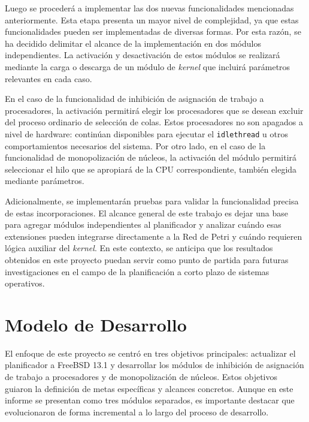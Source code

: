 Luego se procederá a implementar las dos nuevas funcionalidades mencionadas anteriormente. Esta etapa presenta un mayor nivel de complejidad, ya que estas funcionalidades pueden ser implementadas de diversas formas. Por esta razón, se ha decidido delimitar el alcance de la implementación en dos módulos independientes. La activación y desactivación de estos módulos se realizará mediante la carga o descarga de un módulo de \textit{kernel} que incluirá parámetros relevantes en cada caso.\par

En el caso de la funcionalidad de inhibición de asignación de trabajo a procesadores, la activación permitirá elegir los procesadores que se desean excluir del proceso ordinario de selección de colas. Estos procesadores no son apagados a nivel de hardware: continúan disponibles para ejecutar el \texttt{idlethread} u otros comportamientos necesarios del sistema. Por otro lado, en el caso de la funcionalidad de monopolización de núcleos, la activación del módulo permitirá seleccionar el hilo que se apropiará de la CPU correspondiente, también elegida mediante parámetros.\par

Adicionalmente, se implementarán pruebas para validar la funcionalidad precisa de estas incorporaciones. El alcance general de este trabajo es dejar una base para agregar módulos independientes al planificador y analizar cuándo esas extensiones pueden integrarse directamente a la Red de Petri y cuándo requieren lógica auxiliar del \textit{kernel}. En este contexto, se anticipa que los resultados obtenidos en este proyecto puedan servir como punto de partida para futuras investigaciones en el campo de la planificación a corto plazo de sistemas operativos.\par

\section{Modelo de Desarrollo}

El enfoque de este proyecto se centró en tres objetivos principales: actualizar el planificador a FreeBSD 13.1 y desarrollar los módulos de inhibición de asignación de trabajo a procesadores y de monopolización de núcleos. Estos objetivos guiaron la definición de metas específicas y alcances concretos. Aunque en este informe se presentan como tres módulos separados, es importante destacar que evolucionaron de forma incremental a lo largo del proceso de desarrollo.

